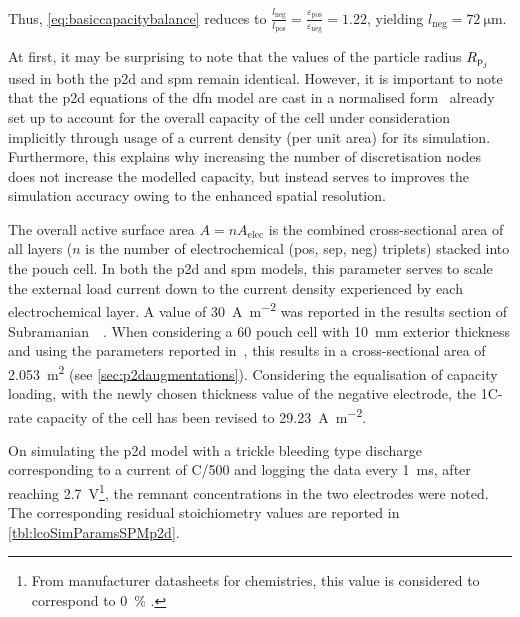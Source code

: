 Thus,                   \cref{eq:basiccapacitybalance}                   reduces
to                      $\frac{l_\text{neg}}{l_\text{pos}}                     =
\frac{\varepsilon_\text{pos}}{\varepsilon_\text{neg}}    =    1.22$,    yielding
$l_\text{neg} = \SI{72}{\micro\meter}$.

At first, it  may be surprising to  note that the values of  the particle radius
$R_{{\text{p}_j}}$ used in  both the \gls{p2d} and \gls{spm} remain  identical. However, it
is important  to note that  the \gls{p2d} equations  of the \gls{dfn}  model are
cast in  a normalised  form \ie~already set  up to  account for  the overall
capacity of the  cell under consideration implicitly through usage  of a current
density  (per unit  area) for  its  simulation. Furthermore,  this explains  why
increasing the  number of  discretisation nodes does  not increase  the modelled
capacity, but  instead serves to improves  the simulation accuracy owing  to the
enhanced spatial resolution.

The  overall  active  surface  area  $A  =  n  A_\text{elec}$  is  the  combined
cross-sectional area of  all layers ($n$ is the number  of electrochemical (pos,
sep,  neg)  triplets)  stacked  into  the pouch  cell.  In  both  the  \gls{p2d}
and  \gls{spm}  models,  this  parameter  serves  to  scale  the  external  load
current  down  to  the  current  density  experienced  by  each  electrochemical
layer.  A   value  of  \approx\SI{30}{\ampere\per\meter\squared}   was  reported
in  the  results  section  of  Subramanian~\etal{}~\cite{Subramanian2009}.  When
considering a  \SI{60}{\amphour} pouch cell with  \SI{10}{\milli\meter} exterior
thickness   and  using   the   parameters  reported   in~\cite{Subramanian2009},
this  results  in  a  cross-sectional area  of  \SI{2.053}{\meter\squared}  (see
\cref{sec:p2daugmentations}). Considering the  equalisation of capacity loading,
with the  newly chosen thickness  value of  the negative electrode,  the 1C-rate
capacity of the cell has been revised to \SI{29.23}{\ampere\per\meter\squared}.

On  simulating  the \gls{p2d}  model  with  a  trickle bleeding  type  discharge
corresponding   to   a  current   of   C/500   and   logging  the   data   every
\SI{1}{\milli\second}, after reaching \SI{2.7}{\volt}\footnote{From manufacturer
datasheets  for   chemistries,  this value  is considered  to
correspond to \SI{0}{\percent} .}, the remnant concentrations
in  the two  electrodes  were noted.  The  corresponding residual  stoichiometry
values are reported in \cref{tbl:lcoSimParamsSPMp2d}.

